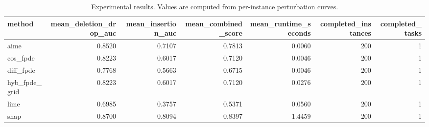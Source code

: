\begin{table}[t]
\caption{Experimental results. Values are computed from per-instance perturbation curves.}
\label{tab:main_results_computed}
\centering
\begin{tabular}{lrrrrrr}
\toprule
method & mean\_deletion\_drop\_auc & mean\_insertion\_auc & mean\_combined\_score & mean\_runtime\_seconds & completed\_instances & completed\_tasks \\
\midrule
aime & 0.8520 & 0.7107 & 0.7813 & 0.0060 & 200 & 1 \\
cos\_fpde & 0.8223 & 0.6017 & 0.7120 & 0.0046 & 200 & 1 \\
diff\_fpde & 0.7768 & 0.5663 & 0.6715 & 0.0046 & 200 & 1 \\
hyb\_fpde\_grid & 0.8223 & 0.6017 & 0.7120 & 0.0276 & 200 & 1 \\
lime & 0.6985 & 0.3757 & 0.5371 & 0.0560 & 200 & 1 \\
shap & 0.8700 & 0.8094 & 0.8397 & 1.4459 & 200 & 1 \\
\bottomrule
\end{tabular}

\end{table}
